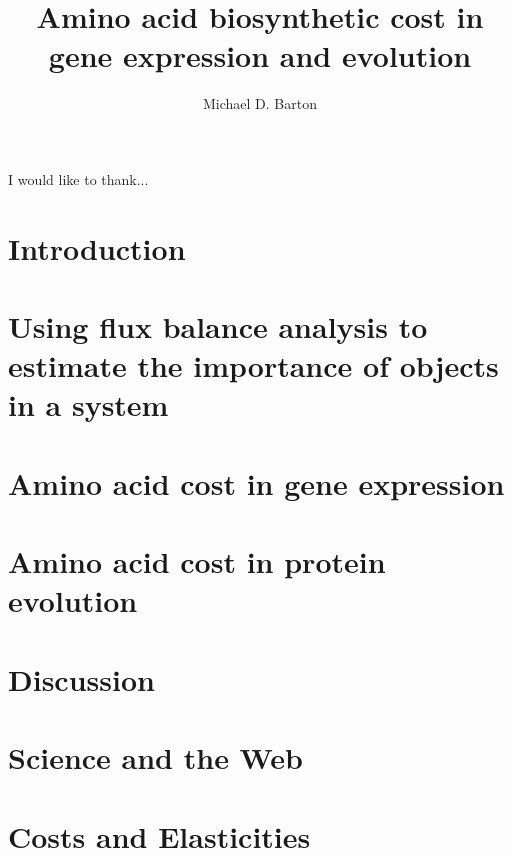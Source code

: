 \documentclass[12pt,PhD]{muthesis}
\begin{document}
\title{Amino acid biosynthetic cost in gene expression and evolution}
\author{Michael D. Barton}

\beforeabstract
{}

\afterabstract
{}
I would like to thank...
\afterpreface


\chapter{Introduction}

\chapter{Using flux balance analysis to estimate the importance of objects in a system}

\chapter{Amino acid cost in gene expression}

\chapter{Amino acid cost in protein evolution}

\chapter{Discussion}





\appendix
\addappheadtotoc
\appendixpage
\chapter{Science and the Web}

\chapter{Costs and Elasticities}

\end{document}
